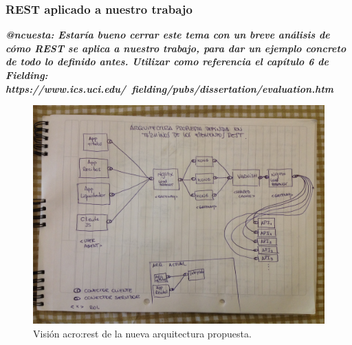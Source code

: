 \subsubsection{REST aplicado a nuestro trabajo}
\label{standard:rest:aplicado}

\textbf{\textit{@ncuesta: Estaría bueno cerrar este tema con un breve análisis de cómo REST se aplica a nuestro trabajo, para dar un ejemplo concreto de todo lo definido antes. Utilizar como referencia el capítulo 6 de Fielding: https://www.ics.uci.edu/~fielding/pubs/dissertation/evaluation.htm}}

\begin{figure}
  \includegraphics[width=\linewidth]{src/images/sin-organizar/nueva-arq-segun-rest.jpg}
  \caption{Visión \gls{acro:rest} de la nueva arquitectura propuesta.}
  \label{fig:ejemplo-rest-nueva-arquitectura}
\end{figure}
